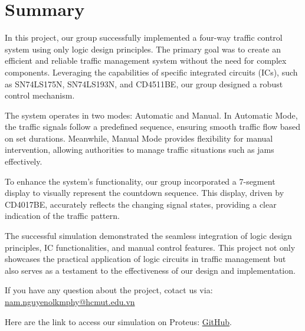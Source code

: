 \documentclass{article}
\begin{document}
\section{Summary}
In this project, our group successfully implemented a four-way traffic control system using only logic design principles. The primary goal was to create an efficient and reliable traffic management system without the need for complex components. Leveraging the capabilities of specific integrated circuits (ICs), such as SN74LS175N, SN74LS193N, and CD4511BE, our group designed a robust control mechanism.\par\vspace{5pt}

The system operates in two modes: Automatic and Manual. In Automatic Mode, the traffic signals follow a predefined sequence, ensuring smooth traffic flow based on set durations. Meanwhile, Manual Mode provides flexibility for manual intervention, allowing authorities to manage traffic situations such as jams effectively.\par\vspace{5pt}

To enhance the system's functionality, our group incorporated a 7-segment display to visually represent the countdown sequence. This display, driven by CD4017BE, accurately reflects the changing signal states, providing a clear indication of the traffic pattern.\par\vspace{5pt}

The successful simulation demonstrated the seamless integration of logic design principles, IC functionalities, and manual control features. This project not only showcases the practical application of logic circuits in traffic management but also serves as a testament to the effectiveness of our design and implementation.\par\vspace{5pt}

If you have any question about the project, cotact us via: \url{nam.nguyenolkmphy@hcmut.edu.vn}\par\vspace{5pt}
Here are the link to access our simulation on Proteus: \href{https://github.com/knammm/Logic-Design-Project}{GitHub}.\par
\newpage
\end{document}
